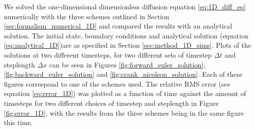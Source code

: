 \documentclass[reprint,english,notitlepage]{revtex4-1}  %
\begin{document}
We solved the one-dimensional dimensionless diffusion equation \eqref{eq:1D_diff_eq} numerically with the three schemes outlined in Section \ref{sec:formalism_numerical_1D} and compared the results with an analytical solution. The initial state, boundary conditions and analytical solution (equation \eqref{eq:analytical_1D})are as specified in Section \ref{sec:method_1D_sims}. Plots of the solutions at two different timesteps, for two different sets of timestep $\Delta t$ and steplength $\Delta x$ can be seen in Figures \ref{fig:forward_euler_solution}, \ref{fig:backward_euler_solution} and \ref{fig:crank_nicolson_solution}. Each of these figures correspond to one of the schemes used. The relative RMS error (see equation \eqref{eq:error_1D}) was plotted as a function of time against the amount of timesteps for two different choices of timestep and steplength in Figure \ref{fig:error_1D}, with the results from the three schemes being in the same figure this time. 
\end{document}
